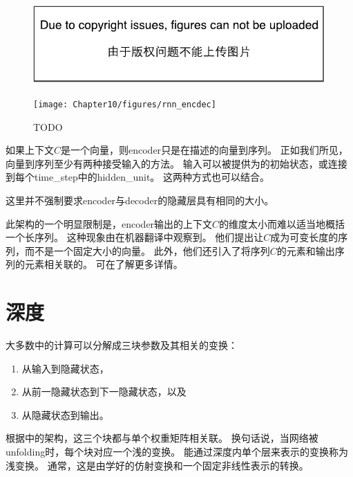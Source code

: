 \begin{figure}[!htb]
\ifOpenSource
\centerline{\includegraphics{figure.pdf}}
\else
\centerline{\texttt{[image: Chapter10/figures/rnn\_encdec]}}
\fi
\caption{TODO}
\label{fig:chap10_rnn_encdec}
\end{figure}

如果上下文$C$是一个向量，则\gls{encoder}只是在描述的向量到序列。
正如我们所见，向量到序列至少有两种接受输入的方法。
输入可以被提供为的初始状态，或连接到每个\gls{time_step}中的\gls{hidden_unit}。
这两种方式也可以结合。

这里并不强制要求\gls{encoder}与\gls{decoder}的隐藏层具有相同的大小。

此架构的一个明显限制是，\gls{encoder}输出的上下文$C$的维度太小而难以适当地概括一个长序列。
这种现象由\cite{Bahdanau-et-al-ICLR2015-small}在机器翻译中观察到。
他们提出让$C$成为可变长度的序列，而不是一个固定大小的向量。
此外，他们还引入了将序列$C$的元素和输出序列的元素相关联的。
可在了解更多详情。


\section{深度}
\label{sec:deep_recurrent_networks}
大多数中的计算可以分解成三块参数及其相关的变换：
\begin{enumerate}
 \item 从输入到隐藏状态，
 \item 从前一隐藏状态到下一隐藏状态，以及
 \item 从隐藏状态到输出。
\end{enumerate}
根据中的架构，这三个块都与单个权重矩阵相关联。
换句话说，当网络被\gls{unfolding}时，每个块对应一个浅的变换。
能通过深度内单个层来表示的变换称为浅变换。
通常，这是由学好的仿射变换和一个固定非线性表示的转换。

